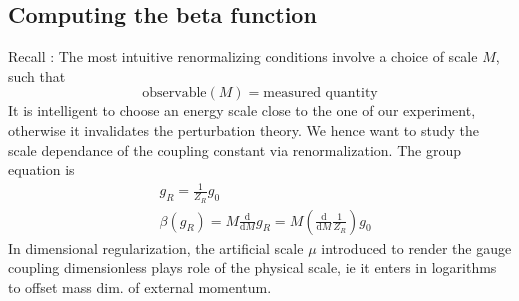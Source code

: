 \documentclass[a4paper]{book}
\theoremstyle{definition}
\theoremstyle{remark}
\begin{document}
\subsection{Computing the beta function}
Recall : The most intuitive renormalizing conditions involve a choice of scale $M$, such that 
    \begin{equation}
        \text{observable}(M) = \text{measured quantity}
    \end{equation}
It is intelligent to choose an energy scale close to the one of our experiment, otherwise it invalidates the perturbation theory. We hence want to study the scale dependance of the coupling constant via renormalization. The group equation is 
\begin{equation}
    \begin{aligned}
        &g_R = \frac{1}{Z_R}g_0 \\ 
        &\beta(g_R) = M\frac{\text{d}}{\text{d}M}g_R = M\left(\frac{\text{d}}{\text{d}M}\frac{1}{Z_R}\right)g_0
    \end{aligned}
\end{equation}
In dimensional regularization, the artificial scale $\mu$ introduced to render the gauge coupling dimensionless plays role of the physical scale, ie it enters in logarithms to offset mass dim. of external momentum. \par \medskip 
\end{document}
